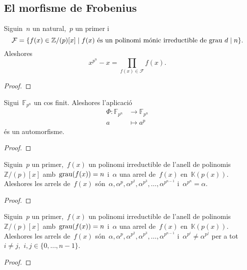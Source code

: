 \documentclass[../estructures-algebraiques.tex]{subfiles}
\begin{document}
    \subsection{El morfisme de Frobenius}    %
    \begin{theorem}
        Siguin~\(n\) un natural,~\(p\) un primer i
        \[
            \mathcal{F}=\{f(x)\in\mathbb{Z}/(p)[x]\mid f(x)\text{ és un polinomi mónic irreductible de grau }d\mathrel{|} n\}.
        \]
        Aleshores
        \[
            x^{p^{n}}-x=\prod_{f(x)\in\mathcal{F}}f(x).
        \]
    \end{theorem}
    \begin{proof}
    \end{proof}
    \begin{proposition}
        Sigui~\(\mathbb{F}_{p^{n}}\) un cos finit.
        Aleshores l'aplicació
        \begin{align*}
        \Phi\colon\mathbb{F}_{p^{n}}&\longrightarrow\mathbb{F}_{p^{n}}\\
        a&\longmapsto a^{p}
        \end{align*}
        és un automorfisme.
    \end{proposition}
    \begin{proof}
    \end{proof}
    \begin{theorem}
        Siguin~\(p\) un primer,~\(f(x)\) un polinomi irreductible de l'anell de polinomis~\(\mathbb{Z}/(p)[x]\) amb~\(\operatorname{grau}(f(x))=n\) i~\(\alpha\) una arrel de~\(f(x)\) en~\(\mathbb{K}(p(x))\).
        Aleshores les arrels de~\(f(x)\) són~\(\alpha,\alpha^{p},\alpha^{p^{2}},\alpha^{p^{3}},\dots,\alpha^{p^{n-1}}\) i~\(\alpha^{p^{n}}=\alpha\).
    \end{theorem}
    \begin{proof}
    \end{proof}
    \begin{theorem}
        Siguin~\(p\) un primer,~\(f(x)\) un polinomi irreductible de l'anell de polinomis~\(\mathbb{Z}/(p)[x]\) amb~\(\operatorname{grau}(f(x))=n\) i~\(\alpha\) una arrel de~\(f(x)\) en~\(\mathbb{K}(p(x))\).
        Aleshores les arrels de~\(f(x)\) són~\(\alpha,\alpha^{p},\alpha^{p^{2}},\alpha^{p^{3}},\dots,\alpha^{p^{n-1}}\) i~\(\alpha^{p^{i}}\neq\alpha^{p^{j}}\) per a tot~\(i\neq j\),~\(i,j\in\{0,\dots,n-1\}\).
    \end{theorem}
    \begin{proof}
    \end{proof}
\end{document}
